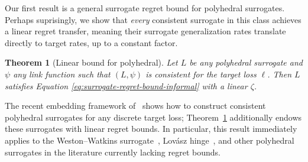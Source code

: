 \documentclass{article}
\newtheorem{theorem}{Theorem}
\theoremstyle{definition}\newtheorem{definition}{Definition}
\theoremstyle{definition}\newtheorem{assumption}{Assumption}
\newcommand{\Comments}{0}
\newcommand{\mynote}[2]{\ifnum\Comments=1\textcolor{#1}{#2}\fi}
\newcommand{\bo}[1]{\mynote{blue}{[Bo: #1]}}
\begin{document}
Our first result is a general surrogate regret bound for polyhedral surrogates.
Perhaps suprisingly, we show that \emph{every} consistent surrogate in this class achieves a linear regret transfer, meaning their surrogate generalization rates translate directly to target rates, up to a constant factor.
\begin{theorem}[Linear bound for polyhedral]
  \label{thm:main-upper}
  Let $L$ be any polyhedral surrogate and $\psi$ any link function such that $(L,\psi)$ is consistent for the target loss $\ell$.
  Then $L$ satisfies Equation \ref{eq:surrogate-regret-bound-informal} with a linear $\zeta$.
\end{theorem}
The recent embedding framework of~\citet{finocchiaro2019embedding} shows how to construct consistent polyhedral surrogates for any discrete target loss; Theorem~\ref{thm:main-upper} additionally endows these surrogates with linear regret bounds.
In particular, this result immediately applies to the Weston--Watkins surrogate~\cite{wang2020weston}, Lov\'asz hinge~\cite{yu2018lovasz,finocchiaro2019embedding}, and other polyhedral surrogates in the literature currently lacking regret bounds.
\end{document}
